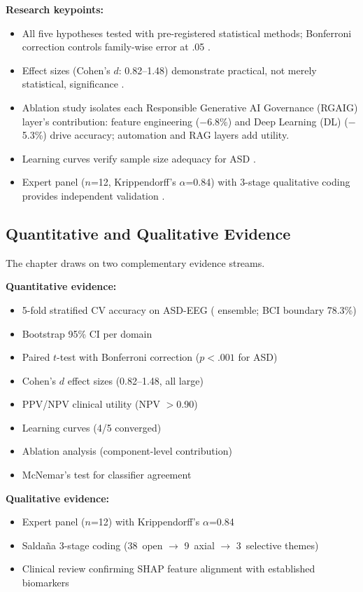 \noindent\textbf{Research keypoints:}
\begin{itemize}[leftmargin=*, itemsep=3pt]
    \item All five hypotheses tested with pre-registered statistical methods; Bonferroni correction controls family-wise error at .05 \cite{cohen1988statistical}.
    \item Effect sizes (Cohen's $d$: 0.82--1.48) demonstrate practical, not merely statistical, significance \cite{cohen1988statistical}.
    \item Ablation study isolates each Responsible Generative AI Governance (RGAIG) layer's contribution: feature engineering ($-$6.8\%) and Deep Learning (DL) ($-$5.3\%) drive accuracy; automation and RAG layers add utility.
    \item Learning curves verify sample size adequacy for ASD \cite{kohavi1995crossvalidation}.
    \item Expert panel ($n$=12, Krippendorff's $\alpha$=0.84) with 3-stage qualitative coding provides independent validation \cite{krippendorff2011computing,saldana2021coding}.
\end{itemize}


\subsection{Quantitative and Qualitative Evidence}

The chapter draws on two complementary evidence streams.

\noindent\textbf{Quantitative evidence:}
\begin{itemize}[leftmargin=*, itemsep=3pt]
    \item 5-fold stratified CV accuracy on ASD-EEG (\asdacc{} ensemble; BCI boundary 78.3\%)
    \item Bootstrap 95\% CI per domain
    \item Paired $t$-test with Bonferroni correction ($p<.001$ for ASD)
    \item Cohen's $d$ effect sizes (0.82--1.48, all large)
    \item PPV/NPV clinical utility (NPV $>$0.90)
    \item Learning curves (4/5 converged)
    \item Ablation analysis (component-level contribution)
    \item McNemar's test for classifier agreement
\end{itemize}

\noindent\textbf{Qualitative evidence:}
\begin{itemize}[leftmargin=*, itemsep=3pt]
    \item Expert panel ($n$=12) with Krippendorff's $\alpha$=0.84
    \item Salda\~{n}a 3-stage coding (38~open $\to$ 9~axial $\to$ 3~selective themes)
    \item Clinical review confirming SHAP feature alignment with established biomarkers
\end{itemize}

